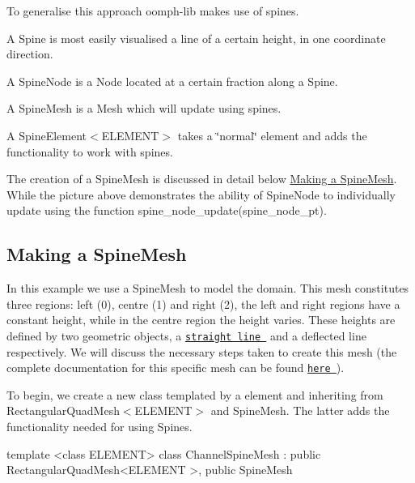 To generalise this approach {\ttfamily oomph-\/lib} makes use of spines.
\begin{DoxyItemize}
\item A {\ttfamily Spine} is most easily visualised a line of a certain height, in one coordinate direction.
\item A {\ttfamily Spine\+Node} is a {\ttfamily Node} located at a certain fraction along a {\ttfamily Spine}.
\item A {\ttfamily Spine\+Mesh} is a {\ttfamily Mesh} which will update using spines.
\item A {\ttfamily Spine\+Element$<$\+E\+L\+E\+M\+E\+N\+T$>$} takes a \char`\"{}normal\char`\"{} element and adds the functionality to work with spines.
\end{DoxyItemize}The creation of a {\ttfamily Spine\+Mesh} is discussed in detail below \hyperlink{index_spine_mesh}{Making a Spine\+Mesh}. While the picture above demonstrates the ability of Spine\+Node to individually update using the function {\ttfamily spine\+\_\+node\+\_\+update(spine\+\_\+node\+\_\+pt)}.\hypertarget{index_spine_mesh}{}\subsection{Making a Spine\+Mesh}\label{index_spine_mesh}
In this example we use a {\ttfamily Spine\+Mesh} to model the domain. This mesh constitutes three regions\+: left (0), centre (1) and right (2), the left and right regions have a constant height, while in the centre region the height varies. These heights are defined by two geometric objects, a \href{../../../the_data_structure/html/classoomph_1_1StraightLine.html}{\tt straight line } and a deflected line respectively. We will discuss the necessary steps taken to create this mesh (the complete documentation for this specific mesh can be found \href{../../../the_data_structure/html/classoomph_1_1ChannelSpineMesh.html}{\tt here }).

To begin, we create a new class templated by a element and inheriting from {\ttfamily Rectangular\+Quad\+Mesh$<$\+E\+L\+E\+M\+E\+N\+T$>$} and {\ttfamily Spine\+Mesh}. The latter adds the functionality needed for using Spines.

 
\begin{DoxyCodeInclude}
\textcolor{keyword}{template} <\textcolor{keyword}{class} ELEMENT>
\textcolor{keyword}{class }ChannelSpineMesh : \textcolor{keyword}{public} RectangularQuadMesh<ELEMENT >, \textcolor{keyword}{public} SpineMesh

\end{DoxyCodeInclude}


